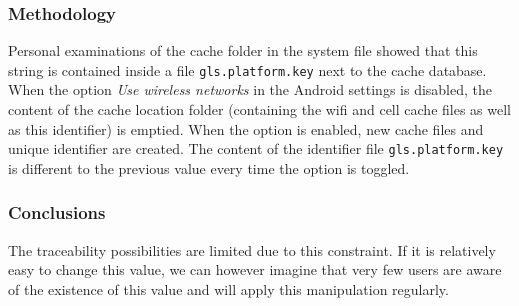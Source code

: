\subsubsection{Methodology}

Personal examinations of the cache folder in the system file showed that this string is contained inside a file \texttt{gls.platform.key} next to the cache database.
When the option \emph{Use wireless networks} in the Android settings is disabled, the content of the cache location folder (containing the wifi and cell cache files as well as this identifier) is emptied.
When the option is enabled, new cache files and unique identifier are created.
The content of the identifier file \texttt{gls.platform.key} is different to the previous value every time the option is toggled.

\subsubsection{Conclusions}

The traceability possibilities are limited due to this constraint.
If it is relatively easy to change this value, we can however imagine that very few users are aware of the existence of this value and will apply this manipulation regularly.





